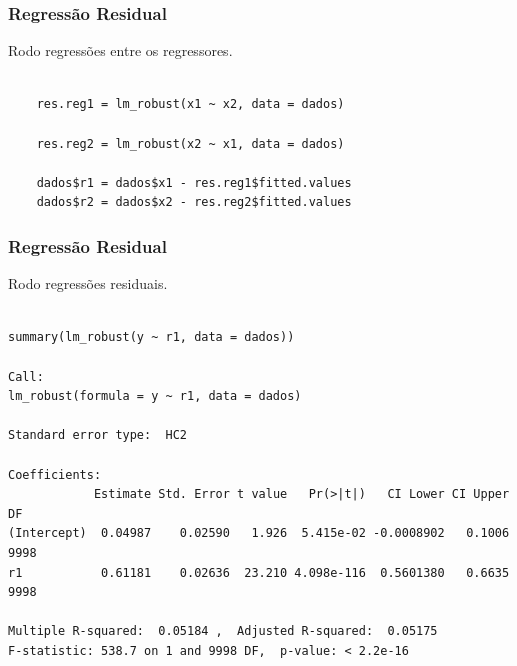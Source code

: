 \documentclass[10pt,slides,xcolor=pdftex,dvipsnames,table]{beamer}
\begin{document}

\begin{frame}[fragile]
	\frametitle{Regressão Residual}

\vspace{0.5cm}
Rodo regressões entre os regressores.

\begin{lstlisting}

	res.reg1 = lm_robust(x1 ~ x2, data = dados)

	res.reg2 = lm_robust(x2 ~ x1, data = dados)
	
	dados$r1 = dados$x1 - res.reg1$fitted.values
	dados$r2 = dados$x2 - res.reg2$fitted.values

\end{lstlisting}

\end{frame}


\begin{frame}[fragile]
	\frametitle{Regressão Residual}

\vspace{0.5cm}
Rodo regressões residuais.

\begin{lstlisting}

summary(lm_robust(y ~ r1, data = dados))

Call:
lm_robust(formula = y ~ r1, data = dados)

Standard error type:  HC2 

Coefficients:
            Estimate Std. Error t value   Pr(>|t|)   CI Lower CI Upper   DF
(Intercept)  0.04987    0.02590   1.926  5.415e-02 -0.0008902   0.1006 9998
r1           0.61181    0.02636  23.210 4.098e-116  0.5601380   0.6635 9998

Multiple R-squared:  0.05184 ,	Adjusted R-squared:  0.05175 
F-statistic: 538.7 on 1 and 9998 DF,  p-value: < 2.2e-16

\end{lstlisting}

\end{frame}

\end{document}
